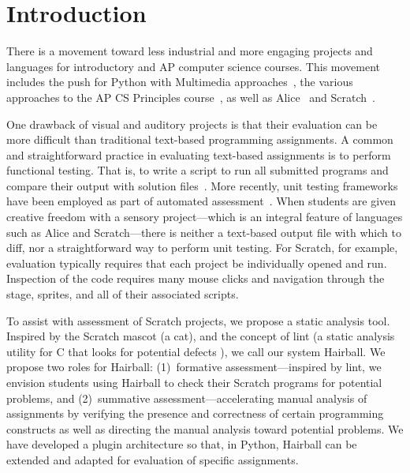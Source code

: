 \section{Introduction}
There is a movement toward less industrial and more engaging projects and
languages for introductory and AP computer science courses.  This movement
includes the push for Python with Multimedia
approaches~\cite{Adams:2012:SLP:2157136.2157319, Forte:2004:CCC:962752.962945,
Simon:2010:ERC:1822090.1822151}, the various approaches to the AP CS Principles
course~\cite{Snyder:2012:FFC:2189835.2189852}, as well as
Alice~\cite{Cooper:2003:TOI:611892.611966} and
Scratch~\cite{Maloney:2010:SPL:1868358.1868363}.

One drawback of visual and auditory projects is that their evaluation can be
more difficult than traditional text-based programming assignments.  A common
and straightforward practice in evaluating text-based assignments is to perform
functional testing. That is, to write a script to run all submitted programs
and compare their output with solution
files~\cite{Jackson:1997:GSP:268084.268210}.  More recently, unit testing
frameworks have been employed as part of automated
assessment~\cite{Spacco:2006:EMD:1140124.1140131,
  Edwards:2003:RCS:949344.949390}.  When students are given creative freedom
with a sensory project---which is an integral feature of languages such as
Alice and Scratch---there is neither a text-based output file with which to
diff, nor a straightforward way to perform unit testing.  For Scratch, for
example, evaluation typically requires that each project be individually opened
and run.  Inspection of the code requires many mouse clicks and navigation
through the stage, sprites, and all of their associated scripts.

To assist with assessment of Scratch projects, we propose a static analysis
tool.  Inspired by the Scratch mascot (a cat), and the concept of lint (a
static analysis utility for C that looks for potential
defects \cite{Johnson78lint}), we call our system Hairball.  We propose two
roles for Hairball: (1)~formative assessment---inspired by lint, we envision
students using Hairball to check their Scratch programs for potential problems,
and (2)~summative assessment---accelerating manual analysis of assignments by
verifying the presence and correctness of certain programming constructs as
well as directing the manual analysis toward potential problems.  We have
developed a plugin architecture so that, in Python, Hairball can be extended
and adapted for evaluation of specific assignments.

